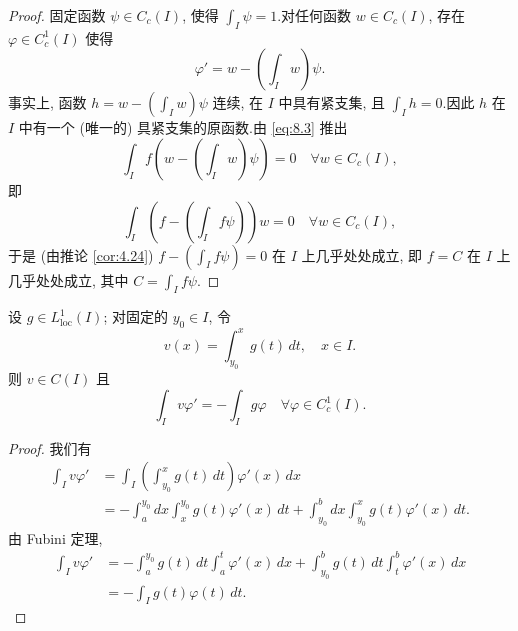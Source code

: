 \begin{proof}
固定函数 $\psi\in C_c(I)$, 使得 $\int_I\psi=1$.对任何函数 $w\in C_c(I)$,
存在 $\varphi\in C_c^1(I)$ 使得
\begin{equation*}
\varphi'=w-\left(\int_I w\right)\psi.
\end{equation*}
事实上, 函数 $h=w-(\int_I w)\psi$ 连续, 在 $I$ 中具有紧支集, 且
$\int_I h=0$.因此 $h$ 在 $I$ 中有一个 (唯一的) 具紧支集的原函数.由
\eqref{eq:8.3} 推出
\begin{equation*}
\int_I f\left(w-\left(\int_I w\right)\psi\right)=0
\quad\forall w\in C_c(I),
\end{equation*}
即
\begin{equation*}
\int_I\left(f-\left(\int_I f\psi\right)\right)w=0
\quad\forall w\in C_c(I),
\end{equation*}
于是 (由推论  \ref{cor:4.24}) $f-(\int_I f\psi)=0$ 在 $I$ 上几乎处处成立,
即 $f=C$ 在 $I$ 上几乎处处成立, 其中 $C=\int_I f\psi$.
\end{proof}

\begin{lemma}
\label{lem:8.2}
设 $g\in L^1_{\mathrm{loc}}(I)$; 对固定的 $y_0\in I$, 令
\begin{equation*}
v(x)=\int_{y_0}^x g(t)\,dt,\quad x\in I.
\end{equation*}
则 $v\in C(I)$ 且
\begin{equation*}
\int_I v\varphi'=-\int_I g\varphi\quad\forall\varphi\in C_c^1(I).
\end{equation*}
\end{lemma}

\begin{proof}
我们有
\begin{equation*}
\begin{aligned}
\int_I v\varphi'
&=\int_I\left(\int_{y_0}^x g(t)\,dt\right)\varphi'(x)\,dx\\
&=-\int_a^{y_0}dx\int_x^{y_0}g(t)\varphi'(x)\,dt
+\int_{y_0}^b dx\int_{y_0}^x g(t)\varphi'(x)\,dt.
\end{aligned}
\end{equation*}
由 Fubini 定理,
\begin{equation*}
\begin{aligned}
\int_I v\varphi'
&=-\int_a^{y_0}g(t)\,dt\int_a^t\varphi'(x)\,dx
+\int_{y_0}^b g(t)\,dt\int_t^b\varphi'(x)\,dx\\
&=-\int_I g(t)\varphi(t)\,dt.
\end{aligned}
\end{equation*}
\end{proof}

